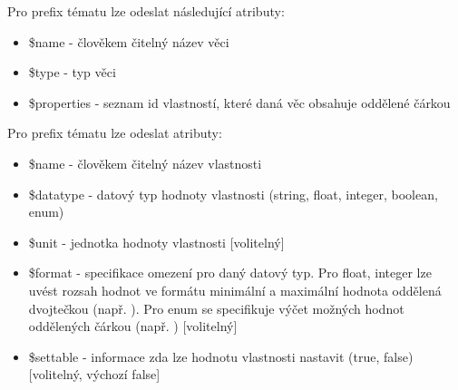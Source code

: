 Pro prefix tématu  lze odeslat následující atributy:
\begin{itemize}
    \item \$name - člověkem čitelný název věci
    \item \$type - typ věci
    \item \$properties - seznam id vlastností, které daná věc obsahuje oddělené čárkou
\end{itemize}

Pro prefix tématu  lze odeslat atributy:
\begin{itemize}
    \item \$name - člověkem čitelný název vlastnosti
    \item \$datatype - datový typ hodnoty vlastnosti (string, float, integer, boolean, enum)
    \item \$unit - jednotka hodnoty vlastnosti [volitelný]
    \item \$format - specifikace omezení pro daný datový typ. Pro float, integer lze uvést rozsah hodnot ve formátu minimální a maximální hodnota oddělená dvojtečkou (např. ). Pro enum se specifikuje výčet možných hodnot oddělených čárkou (např. ) [volitelný]
    \item \$settable - informace zda lze hodnotu vlastnosti nastavit (true, false) [volitelný, výchozí false]
\end{itemize}



